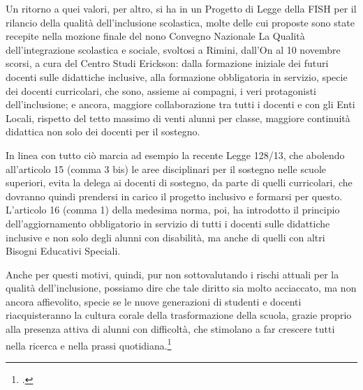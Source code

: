 Un ritorno a quei valori, per altro, si ha in un Progetto di Legge della FISH per il rilancio della qualità dell'inclusione scolastica, molte delle cui proposte sono state recepite nella mozione finale\pageref{cha:aavv101113} del nono Convegno Nazionale La Qualità dell'integrazione scolastica e sociale, svoltosi a Rimini, dall'On al 10 novembre scorsi, a cura del Centro Studi Erickson: dalla formazione iniziale dei futuri docenti sulle didattiche inclusive, alla formazione obbligatoria in servizio, specie dei docenti curricolari, che sono, assieme ai compagni, i veri protagonisti dell'inclusione; e ancora, maggiore collaborazione tra tutti i docenti e con gli Enti Locali, rispetto del tetto massimo di venti alunni per classe, maggiore continuità didattica non solo dei docenti per il sostegno.

In linea con tutto ciò marcia ad esempio la recente Legge 128/13, che abolendo all'articolo 15 (comma 3 bis) le aree disciplinari per il sostegno nelle scuole superiori, evita la delega ai docenti di sostegno, da parte di quelli curricolari, che dovranno quindi prendersi in carico il progetto inclusivo e formarsi per questo. L'articolo 16 (comma 1) della medesima norma, poi, ha introdotto il principio dell'aggiornamento obbligatorio in servizio di tutti i docenti sulle didattiche inclusive e non solo degli alunni con disabilità, ma anche di quelli con altri Bisogni Educativi Speciali.

Anche per questi motivi, quindi, pur non sottovalutando i rischi attuali per la qualità dell'inclusione, possiamo dire che tale diritto sia molto acciaccato, ma non ancora affievolito, specie se le nuove generazioni di studenti e docenti riacquisteranno la cultura corale della trasformazione della scuola, grazie proprio alla presenza attiva di alunni con difficoltà, che stimolano a far crescere tutti nella ricerca e nella prassi quotidiana.\footcite{Nocera2013c}